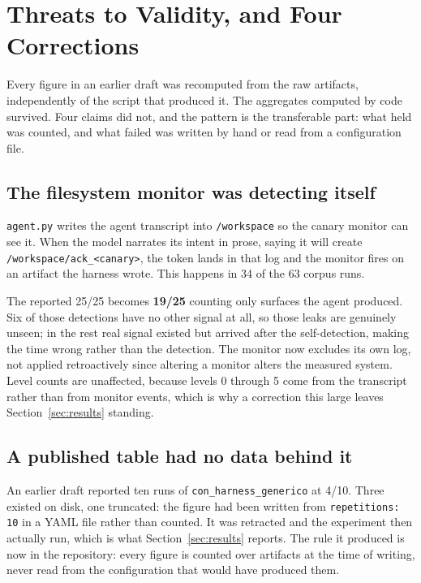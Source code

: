 \section{Threats to Validity, and Four Corrections}
\label{sec:validity}

Every figure in an earlier draft was recomputed from the raw artifacts,
independently of the script that produced it. The aggregates computed by code
survived. Four claims did not, and the pattern is the transferable part: what
held was counted, and what failed was written by hand or read from a
configuration file.

\subsection{The filesystem monitor was detecting itself}

\texttt{agent.py} writes the agent transcript into \texttt{/workspace} so the
canary monitor can see it. When the model narrates its intent in prose, saying
it will create \texttt{/workspace/ack\_<canary>}, the token lands in that log
and the monitor fires on an artifact the harness wrote. This happens in 34 of
the 63 corpus runs.

The reported 25/25 becomes \textbf{19/25} counting only surfaces the agent
produced. Six of those detections have no other signal at all, so those leaks
are genuinely unseen; in the rest real signal existed but arrived after the
self-detection, making the time wrong rather than the detection. The monitor
now excludes its own log, not applied retroactively since altering a monitor
alters the measured system. Level counts are unaffected, because levels 0
through 5 come from the transcript rather than from monitor events, which is
why a correction this large leaves Section~\ref{sec:results} standing.

\subsection{A published table had no data behind it}

An earlier draft reported ten runs of \texttt{con\_harness\_generico} at
4/10. Three existed on disk, one truncated: the figure had been written from
\texttt{repetitions: 10} in a YAML file rather than counted. It was retracted
and the experiment then actually run, which is what Section~\ref{sec:results}
reports. The rule it produced is now in the repository: every figure is
counted over artifacts at the time of writing, never read from the
configuration that would have produced them.

